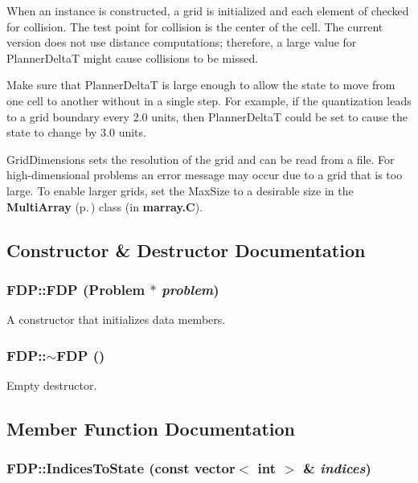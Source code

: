 When an instance is constructed, a grid is initialized and each element of checked for collision. The test point for collision is the center of the cell. The current version does not use distance computations; therefore, a large value for Planner\-Delta\-T might cause collisions to be missed.

Make sure that Planner\-Delta\-T is large enough to allow the state to move from one cell to another without in a single step. For example, if the quantization leads to a grid boundary every 2.0 units, then Planner\-Delta\-T could be set to cause the state to change by 3.0 units.

Grid\-Dimensions sets the resolution of the grid and can be read from a file. For high-dimensional problems an error message may occur due to a grid that is too large. To enable larger grids, set the Max\-Size to a desirable size in the {\bf Multi\-Array} {\rm (p.\,\pageref{classMultiArray})} class (in {\bf marray.C}). 



\subsection{Constructor \& Destructor Documentation}
\subsubsection{\setlength{\rightskip}{0pt plus 5cm}FDP::FDP ({\bf Problem} $\ast$ {\em problem})}\label{classFDP_a0}


A constructor that initializes data members.

\subsubsection{\setlength{\rightskip}{0pt plus 5cm}FDP::$\sim$FDP ()\hspace{0.3cm}{\tt  [inline]}}\label{classFDP_a1}


Empty destructor.



\subsection{Member Function Documentation}
\subsubsection{ FDP::Indices\-To\-State (const vector$<$ int $>$ \& {\em indices})\hspace{0.3cm}{\tt  [protected, virtual]}}\label{classFDP_b2}


